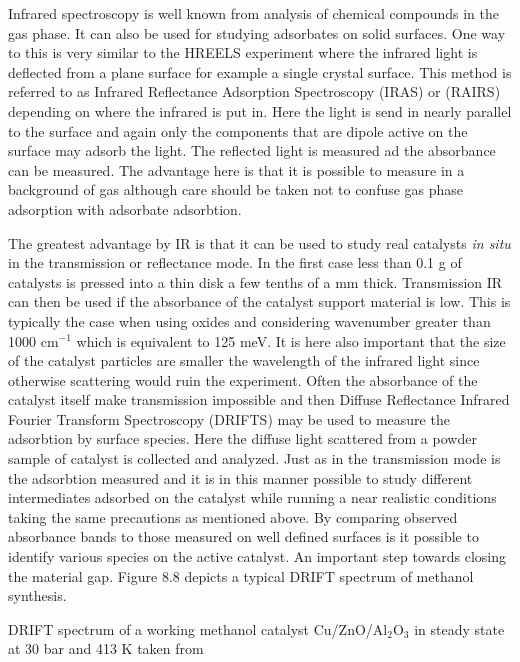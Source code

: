 Infrared spectroscopy is well known from analysis of chemical compounds in the gas phase. It can also be used for studying adsorbates on solid surfaces. One way to this is very similar to the HREELS experiment where the infrared light is deflected from a plane surface for example a single crystal surface.  This method is referred to as Infrared Reflectance Adsorption Spectroscopy (IRAS) or (RAIRS) depending on where the infrared is put in. Here the light is send in nearly parallel to the surface and again only the components that are dipole active on the surface may adsorb the light. The reflected light is measured ad the absorbance can be measured. The advantage here is that it is possible to measure in a background of gas although care should be taken not to confuse gas phase adsorption  with adsorbate adsorbtion. 

The greatest advantage by IR  is that  it can be used to study real catalysts {\it in situ} in the transmission or reflectance mode. In the first case less than 0.1 g of catalysts is  pressed into a thin disk a few tenths of a mm thick. Transmission IR can then be used if the absorbance of the catalyst support material is low. This is typically the case when using oxides and considering wavenumber greater than 1000 cm$^{-1}$ which is equivalent to 125 meV. It is here also important that the size of the catalyst particles are smaller the wavelength of the infrared light since otherwise scattering would ruin the experiment. Often the absorbance of the catalyst itself make transmission impossible and then Diffuse Reflectance Infrared  Fourier Transform Spectroscopy (DRIFTS) may be used to measure the adsorbtion by surface species. Here the diffuse light scattered from a powder sample of catalyst is collected and analyzed. Just as in the transmission mode is the adsorbtion measured and it is in this manner possible to study different intermediates adsorbed on the catalyst while running a near realistic conditions taking the same precautions as mentioned above. By comparing observed absorbance bands to those measured on well defined surfaces is it possible to identify various species on the active catalyst. An important step towards closing the material gap. Figure 8.8 depicts a typical DRIFT spectrum of  methanol synthesis.




\vspace*{11cm}

 DRIFT spectrum of a working methanol catalyst Cu/ZnO/Al$_{2}$O$_{3}$  in steady state at 30 bar and 413 K taken from \cite{Bailey}
\vspace{1cm} 
